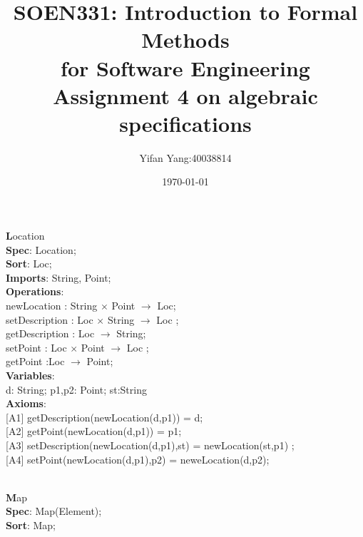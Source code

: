 \documentclass[12pt]{article}
\title{SOEN331: Introduction to Formal Methods\\for Software Engineering\\
Assignment 4 on algebraic specifications}
\author{Yifan Yang:40038814}
\date{\today}
\begin{document}
\begin{spacing}{1.5}

\maketitle  
\noindent \textbf Location\\
\noindent \textbf{Spec}: Location;\\
\noindent \textbf{Sort}: Loc;\\
\noindent \textbf{Imports}: String, Point;\\
\noindent \textbf{Operations}:\\
\hspace*{5mm} newLocation : String $\times$ Point $\rightarrow$ Loc;\\
\hspace*{5mm} setDescription : Loc $\times$  String $\rightarrow$ Loc ;\\
\hspace*{5mm} getDescription : Loc $\rightarrow$ String;\\
\hspace*{5mm} setPoint : Loc $\times$  Point $\rightarrow$ Loc ;\\
\hspace*{5mm} getPoint :Loc $\rightarrow$ Point;\\
\noindent \textbf{Variables}:\\
\hspace*{5mm} d: String; p1,p2: Point; st:String\\
\noindent \textbf{Axioms}:\\
\hspace*{5mm} [A1] getDescription(newLocation(d,p1)) = d;\\
\hspace*{5mm} [A2] getPoint(newLocation(d,p1)) = p1;\\
\hspace*{5mm} [A3] setDescription(newLocation(d,p1),st) = newLocation(st,p1)   ;\\
\hspace*{5mm} [A4] setPoint(newLocation(d,p1),p2) = neweLocation(d,p2);\\
\\
\maketitle  
\noindent \textbf Map\\
\noindent \textbf{Spec}: Map(Element);\\
\noindent \textbf{Sort}: Map;\\

\end{spacing}
\end{document}
